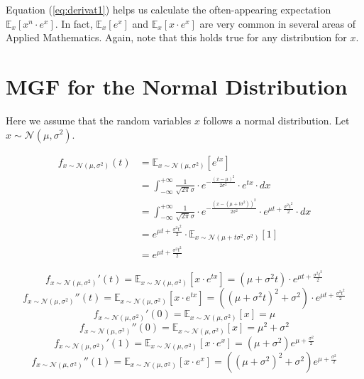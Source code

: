 \documentclass[10pt]{amsart}
\begin{document}
Equation (\ref{eq:derivat1}) helps us calculate the often-appearing expectation $\mathbb{E}_x[x^n \cdot e^x]$. In fact, $\mathbb{E}_x[e^x]$ and $\mathbb{E}_x[x \cdot e^x]$ are very common in several areas of Applied Mathematics. Again, note that this holds true for any distribution for $x$.

\section{MGF for the Normal Distribution}
Here we assume that the random variables $x$ follows a normal distribution. Let $x \sim \mathcal{N}(\mu, \sigma^2)$.

\begin{align}
f_{x\sim \mathcal{N}(\mu, \sigma^2)}(t) & = \mathbb{E}_{x\sim \mathcal{N}(\mu, \sigma^2)}[e^{tx}] \\
& = \int_{-\infty}^{+\infty} \frac {1} {\sqrt{2\pi} \sigma} \cdot e^{-\frac {(x - \mu)^2} {2\sigma^2}} \cdot e^{tx} \cdot dx \\
& = \int_{-\infty}^{+\infty} \frac {1} {\sqrt{2\pi} \sigma} \cdot e^{-\frac {(x-(\mu +t\sigma^2))^2} {2\sigma^2}} \cdot e^{\mu t + \frac {\sigma^2 t^2} {2}} \cdot dx \\
& = e^{\mu t + \frac {\sigma^2 t^2} 2} \cdot \mathbb{E}_{x\sim \mathcal{N}(\mu + t\sigma^2, \sigma^2)}[1] \\
& = e^{\mu t + \frac {\sigma^2 t^2} 2}
\end{align}

\begin{equation}
f_{x\sim \mathcal{N}(\mu, \sigma^2)}'(t) = \mathbb{E}_{x\sim \mathcal{N}(\mu, \sigma^2)}[x \cdot e^{tx}] = (\mu + \sigma^2t)\cdot e^{\mu t + \frac {\sigma^2 t^2} 2} \label{eq:normmgfderiv}
\end{equation}
\begin{equation}
f_{x\sim \mathcal{N}(\mu, \sigma^2)}''(t) = \mathbb{E}_{x\sim \mathcal{N}(\mu, \sigma^2)}[x \cdot e^{tx}] = ((\mu + \sigma^2t)^2 + \sigma^2)\cdot e^{\mu t + \frac {\sigma^2 t^2} 2} \label{eq:normmgfdoublederiv}
\end{equation}
\begin{equation}
f_{x\sim \mathcal{N}(\mu, \sigma^2)}'(0) = \mathbb{E}_{x\sim \mathcal{N}(\mu, \sigma^2)}[x] = \mu
\end{equation}
\begin{equation}
f_{x\sim \mathcal{N}(\mu, \sigma^2)}''(0) = \mathbb{E}_{x\sim \mathcal{N}(\mu, \sigma^2)}[x] = \mu^2 + \sigma^2
\end{equation}
\begin{equation}
f_{x\sim \mathcal{N}(\mu, \sigma^2)}'(1) = \mathbb{E}_{x\sim \mathcal{N}(\mu, \sigma^2)}[x\cdot e^x] = (\mu + \sigma^2)e^{\mu+ \frac {\sigma^2} 2}
\end{equation}
\begin{equation}
f_{x\sim \mathcal{N}(\mu, \sigma^2)}''(1) = \mathbb{E}_{x\sim \mathcal{N}(\mu, \sigma^2)}[x\cdot e^x] = ((\mu + \sigma^2)^2 + \sigma^2)e^{\mu+ \frac {\sigma^2} 2}
\end{equation}
\end{document}
